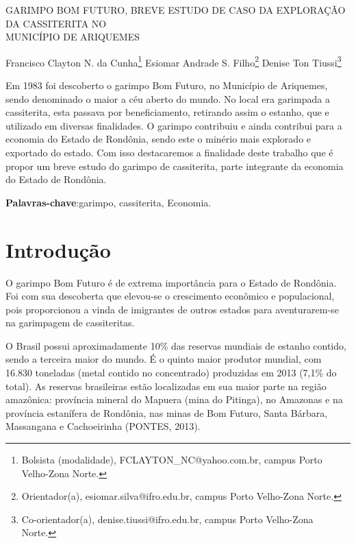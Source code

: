 \documentclass[article,12pt,onesidea,4paper,english,brazil]{abntex2}
\begin{document}
	
	
	\frenchspacing 
	
	\begin{center}
		\LARGE GARIMPO BOM FUTURO, BREVE ESTUDO DE CASO DA EXPLORAÇÃO DA CASSITERITA NO\\MUNICÍPIO DE ARIQUEMES
		
		\normalsize
		Francisco Clayton N. da Cunha\footnote{Bolsista (modalidade), FCLAYTON\_NC@yahoo.com.br, campus Porto Velho-Zona Norte.} 
	Esiomar Andrade S. Filho\footnote{Orientador(a), esiomar.silva@ifro.edu.br, campus Porto Velho-Zona Norte.} 
	Denise Ton Tiussi\footnote{Co-orientador(a), denise.tiussi@ifro.edu.br, campus Porto Velho-Zona Norte.}
	\end{center}
	
	\begin{resumoumacoluna}
	Em 1983 foi descoberto o garimpo Bom Futuro, no Município de Ariquemes, sendo denominado o maior a céu aberto do mundo. No local era garimpada a cassiterita, esta passava por beneficiamento, retirando assim o estanho, que e utilizado em diversas finalidades. O garimpo contribuiu e ainda contribui para a economia do Estado de Rondônia, sendo este o minério mais explorado e exportado do estado. Com isso destacaremos a finalidade deste trabalho que é propor um breve estudo do garimpo de cassiterita, parte integrante da economia do Estado de Rondônia.
	
		\vspace{\onelineskip}
		
		\noindent
		\textbf{Palavras-chave}:garimpo, cassiterita, Economia.
	\end{resumoumacoluna}
	
	\section*{Introdução}
	
O garimpo Bom Futuro é de extrema importância para o Estado de Rondônia. Foi com sua descoberta que elevou-se o crescimento econômico e populacional, pois proporcionou a vinda de imigrantes de outros estados para aventurarem-se na garimpagem de cassiteritas.

O Brasil possui aproximadamente 10\% das reservas mundiais de estanho contido, sendo a terceira maior do mundo. É o quinto maior produtor mundial, com 16.830 toneladas (metal contido no concentrado) produzidas em 2013 (7,1\% do total). As reservas brasileiras estão localizadas em sua maior parte na região amazônica: província mineral do Mapuera (mina do Pitinga), no Amazonas e na província estanífera de Rondônia, nas minas de Bom Futuro, Santa Bárbara, Massangana e Cachoeirinha (PONTES, 2013).
\end{document}
